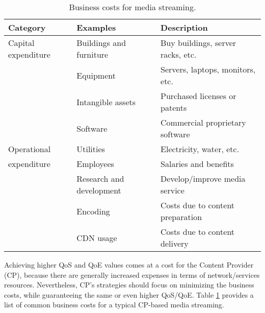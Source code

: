 \begin{table}[t]
	\caption{Business costs for media streaming.}
	\centering
	\label{tab:IEEECOMSTcosts}
	\def\arraystretch{1.2}%
	\setlength\tabcolsep{2.0pt} %
	{\scriptsize
	\begin{tabular}{>{\centering\arraybackslash}m{}
			>{\centering\arraybackslash}m{}
			>{\centering\arraybackslash}m{}
		}
		\toprule
		\textbf{Category} & \textbf{Examples} & \textbf{Description} \\
		\midrule
		\midrule
		Capital expenditure & Buildings and furniture & Buy buildings, server racks, etc. \\
		\cline{2-3}
		& Equipment & Servers, laptops, monitors, etc. \\
		\cline{2-3}
		& Intangible assets & Purchased licenses or patents \\
		\cline{2-3}
		& Software & Commercial proprietary software \\
		\hline
		Operational & Utilities & Electricity, water, etc. \\
		\cline{2-3}
		expenditure & Employees & Salaries and benefits \\
		\cline{2-3}
		& Research and development & Develop/improve media service \\
		\cline{2-3}
		& Encoding & Costs due to content preparation \\
		\cline{2-3}
		& CDN usage & Costs due to content delivery \\
		\bottomrule
		\bottomrule
	\end{tabular}
	}
\end{table}

Achieving higher QoS and QoE values comes at a cost for the Content Provider (CP), because there are generally increased expenses in terms of network/services resources. %
Nevertheless, CP's strategies should focus on minimizing the business costs, while guaranteeing the same or even higher QoS/QoE. Table \ref{tab:IEEECOMSTcosts} provides a list of common business costs for a typical CP-based media streaming.

